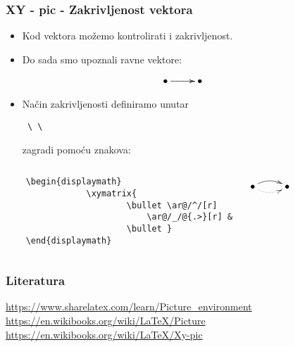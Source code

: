 \documentclass[9pt]{beamer}
\begin{document}
\begin{frame}[fragile]
    \frametitle{XY - pic - Zakrivljenost vektora}
    
    \begin{itemize} 
        \item Kod vektora možemo kontrolirati i zakrivljenost.
        \item Do sada smo upoznali ravne vektore:
    \end{itemize}
    \begin{displaymath}
            \xymatrix{ \bullet \ar[r] \ar@{.>}[r] & \bullet }
    \end{displaymath}
    \begin{itemize}
		\item Način zakrivljenosti definiramo unutar \begin{verbatim} \ \ \end{verbatim} zagradi pomoću  znakova:
    \end{itemize}


    \begin{columns}
    \begin{verbatim}
    \begin{displaymath}
                \xymatrix{
                        \bullet \ar@/^/[r]
                            \ar@/_/@{.>}[r] &
                        \bullet }
    \end{displaymath}
    \end{verbatim}
    \begin{displaymath}
                \xymatrix{
                        \bullet \ar@/^/[r]
                           \ar@/_/@{.>}[r] &
                        \bullet }
\end{displaymath}
\end{columns}

\end{frame}
\newpage
\begin{frame}
\frametitle{Literatura}	

\begin{thebibliography}{9}
\beamertemplatetextbibitems
{} \url{https://www.sharelatex.com/learn/Picture_environment}
 	\url{https://en.wikibooks.org/wiki/LaTeX/Picture}
 \url{https://en.wikibooks.org/wiki/LaTeX/Xy-pic}
\end{thebibliography}

\end{frame}
\end{document}
